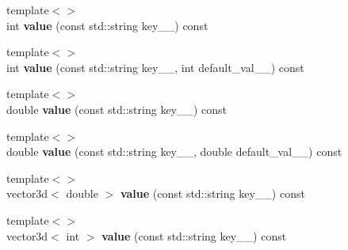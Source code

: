 \begin{DoxyCompactItemize}
\item 
\hypertarget{classcmd__args_a7605f71d0dbb7c539fe2b7891356c3f7}{}{\footnotesize template$<$$>$ }\\int {\bfseries value} (const std\+::string key\+\_\+\+\_\+) const \label{classcmd__args_a7605f71d0dbb7c539fe2b7891356c3f7}

\item 
\hypertarget{classcmd__args_a97747ec7189a5f8c22d7319c92367e2e}{}{\footnotesize template$<$$>$ }\\int {\bfseries value} (const std\+::string key\+\_\+\+\_\+, int default\+\_\+val\+\_\+\+\_\+) const \label{classcmd__args_a97747ec7189a5f8c22d7319c92367e2e}

\item 
\hypertarget{classcmd__args_a9349e70c1573b9362c12f6bb88850668}{}{\footnotesize template$<$$>$ }\\double {\bfseries value} (const std\+::string key\+\_\+\+\_\+) const \label{classcmd__args_a9349e70c1573b9362c12f6bb88850668}

\item 
\hypertarget{classcmd__args_a4017fdd3568da8d07ef39d6f76656835}{}{\footnotesize template$<$$>$ }\\double {\bfseries value} (const std\+::string key\+\_\+\+\_\+, double default\+\_\+val\+\_\+\+\_\+) const \label{classcmd__args_a4017fdd3568da8d07ef39d6f76656835}

\item 
\hypertarget{classcmd__args_ab1fd7e667835527aac7349316e50d5dd}{}{\footnotesize template$<$$>$ }\\vector3d$<$ double $>$ {\bfseries value} (const std\+::string key\+\_\+\+\_\+) const \label{classcmd__args_ab1fd7e667835527aac7349316e50d5dd}

\item 
\hypertarget{classcmd__args_a559fd1c1e4bccda1b2e9fe4cbbde626f}{}{\footnotesize template$<$$>$ }\\vector3d$<$ int $>$ {\bfseries value} (const std\+::string key\+\_\+\+\_\+) const \label{classcmd__args_a559fd1c1e4bccda1b2e9fe4cbbde626f}

\end{DoxyCompactItemize}
